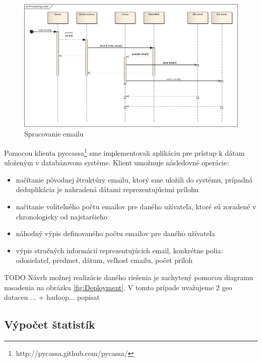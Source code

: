 \documentclass[11pt,twoside,a4paper]{book}
\begin{document}
\begin{figure}[h]
 \centering
 \includegraphics[width=16cm]{./figures/emailProcessing.png}
 \caption{Spracovanie emailu}
 \label{fig:Cseq}
\end{figure}

Pomocou klienta pyccassa\footnote{http://pycassa.github.com/pycassa/} sme implementovali aplikáciu pre prístup k dátam uloženým v databázovom systéme. Klient umožnuje následovné operácie:
\begin{itemize}
 \item načítanie pôvodnej štruktúry emailu, ktorý sme uložili do systému, prípadná deduplikácia je nahradená dátami reprezentujúcimi prílohu
 \item načitanie voliteľného počtu emailov pre daného užívateľa, ktoré sú zoradené v chronologicky od najstaršieho
 \item náhodný výpis definovaného počtu emailov pre daného užívateľa
 \item výpis stručných informácií reprezentujúcich email, konkrétne polia: odosielateľ, predmet, dátum, veľkosť emailu, počet príloh
\end{itemize}


TODO
Návrh možnej realizácie daného riešenia je zachytený pomocou diagramu nasadenia na obrázku \ref{fig:Deployment}. V tomto prípade uvažujeme 2 geo datacen ... + hadoop... popisat


\subsection{Výpočet štatistík}
\end{document}
